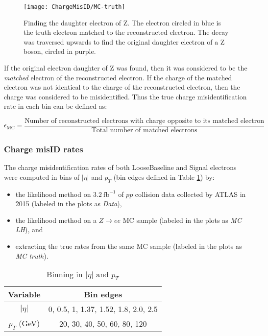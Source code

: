 \begin{figure}[h!]
\centering
\texttt{[image: ChargeMisID/MC-truth]}
\caption[Finding the original daughter electron of Z]{Finding the  daughter electron of Z. The electron circled in blue is the truth electron matched to the reconstructed electron. The decay was traversed upwards to find the original daughter electron of a Z boson, circled in purple.}
\label{fig:find-daughter-electron}
\end{figure}

If the original electron daughter of Z was found, then it was considered to be the \textit{matched} electron of the reconstructed electron. If the charge of the matched electron was not identical to the charge of the reconstructed electron, then the charge was considered to be misidentified. Thus the true charge misidentification rate in each bin can be defined as:

\begin{equation}
\epsilon_{\text{MC}} = \frac{\text{Number of reconstructed electrons with charge opposite to its matched electron}}{\text{Total number of matched electrons}}
\end{equation}

\subsubsection*{Charge misID rates}
The charge misidentification rates of both LooseBaseline and Signal electrons were computed in bins of $|\eta|$ and $p_T$ (bin edges defined in Table \ref{table:binning}) by:
\begin{itemize}
\item the likelihood method on $3.2\  \text{fb}^{-1}$ of $pp$ collision data collected by ATLAS in 2015 (labeled in the plots as \textit{Data}),
\item the likelihood method on a $Z\rightarrow ee$ MC sample (labeled in the plots as \textit{MC LH}), and
\item extracting the true rates from the same MC sample (labeled in the plots as \textit{MC truth}).
\end{itemize}

\begin{table}[h!]
\centering
\begin{tabular}{c | c}
\textbf{Variable} & \textbf{Bin edges} \\
\hline
$|\eta|$ & 0, 0.5, 1, 1.37, 1.52, 1.8, 2.0, 2.5 \\
$p_T$ (GeV) &  20, 30, 40, 50, 60, 80, 120
\end{tabular}
\caption{Binning in $|\eta|$ and $p_T$}
\label{table:binning}
\end{table}

